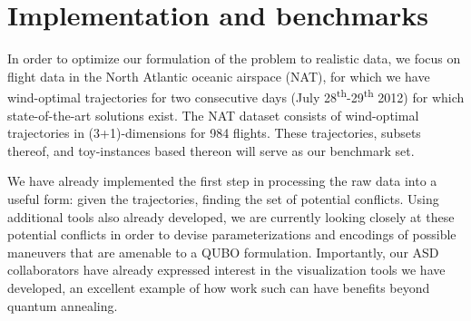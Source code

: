 \section*{Implementation and benchmarks}

In order to optimize our formulation of the problem to realistic data, we focus
on flight data in the North Atlantic oceanic airspace (NAT), for which we have
wind-optimal trajectories for two consecutive days (July
28\textsuperscript{th}-29\textsuperscript{th} 2012) for which state-of-the-art
solutions exist.  The NAT dataset consists of wind-optimal trajectories in
(3+1)-dimensions for 984 flights. 
These trajectories, subsets thereof, and toy-instances based thereon will serve as our benchmark set.

\indent We have already implemented the first step in processing the raw data
into a useful form: given the trajectories, finding the set of potential
conflicts.  Using additional tools also already developed, we are currently
looking closely at these potential conflicts in order to devise
parameterizations and encodings of possible maneuvers that are amenable to a
QUBO formulation.
Importantly, our ASD collaborators have already expressed interest in the visualization tools we have developed, an excellent example of how work such can have benefits beyond quantum annealing.
